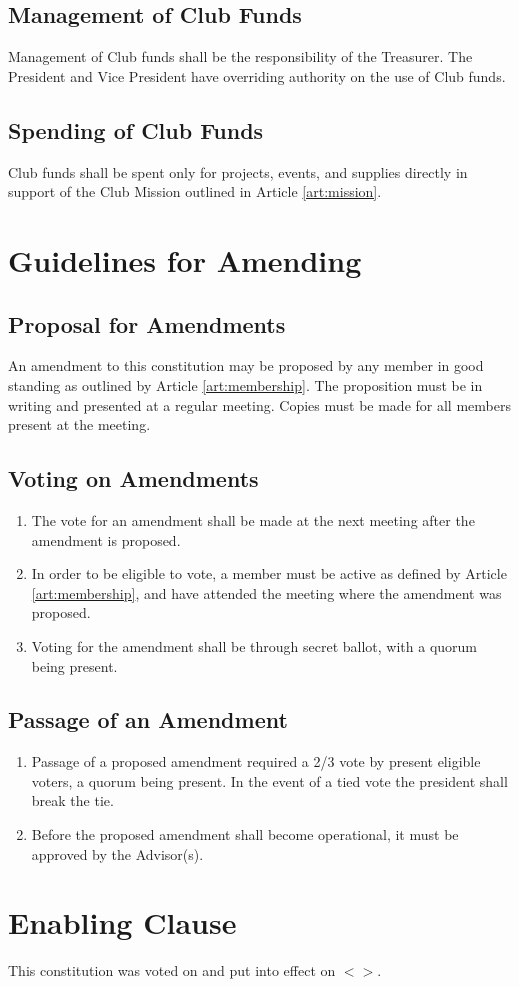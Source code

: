 \documentclass[english,11pt]{article}
\begin{document}
\subsection{Management of Club Funds} \label{sect:funds:management}
Management of Club funds shall be the responsibility of the Treasurer.
The President and Vice President have overriding authority on the use of Club funds.

\subsection{Spending of Club Funds} \label{sect:funds:spending}
Club funds shall be spent only for projects, events, and supplies directly in support of the Club Mission outlined in Article \ref{art:mission}.

\section{Guidelines for Amending} \label{art:amending}

\subsection{Proposal for Amendments} \label{sect:amending:proposal}
An amendment to this constitution may be proposed by any member in good standing as outlined by Article \ref{art:membership}.
The proposition must be in writing and presented at a regular meeting.
Copies must be made for all members present at the meeting.

\subsection{Voting on Amendments}  \label{sect:amending:voting}
\begin{enumerate}[label=\Alph*.]
\item The vote for an amendment shall be made at the next meeting after the amendment is proposed.
\item In order to be eligible to vote, a member must be active as defined by Article \ref{art:membership}, and have attended the meeting where the amendment was proposed.
\item Voting for the amendment shall be through secret ballot, with a quorum being present.
\end{enumerate}

\subsection{Passage of an Amendment} \label{sect:amending:passage}
\begin{enumerate}[label=\Alph*.]
\item Passage of a proposed amendment required a 2/3 vote by present eligible voters, a quorum being present. 
    In the event of a tied vote the president shall break the tie.
\item Before the proposed amendment shall become operational, it must be approved by the Advisor(s).
\end{enumerate}

\section{Enabling Clause} \label{art:enabling}
This constitution was voted on and put into effect on $<>$.
\end{document}
